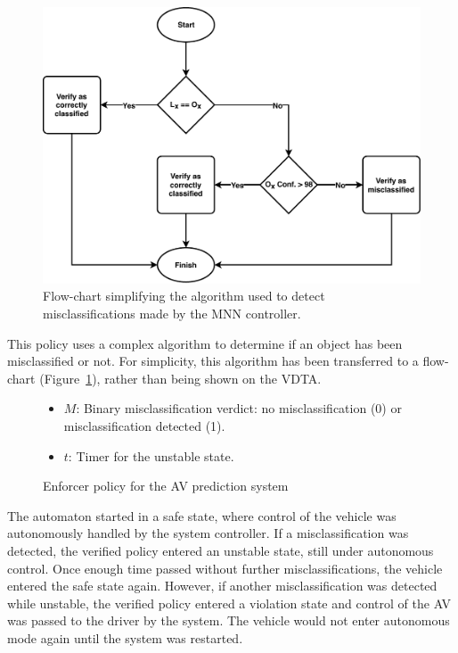 \begin{figure}[h]
	\centering
	\includegraphics[width=\textwidth]{Content/fig/flow-misclassify.pdf}
	\caption{Flow-chart simplifying the algorithm used to detect misclassifications made by the \ac{MNN} controller.} \label{fig:flow}
\end{figure}

This policy uses a complex algorithm to determine if an object has been misclassified or not.
For simplicity, this algorithm has been transferred to a flow-chart (Figure~\ref{fig:flow}), rather than being shown on the \ac{VDTA}.

\begin{figure}[h]
	\centering
	\scalebox{1}{}
	\begin{itemize}
		\item $M$: Binary misclassification verdict: no misclassification (0) or misclassification detected (1).
		\item $t$: Timer for the unstable state.
	\end{itemize}
	
	\caption{Enforcer policy for the \acf{AV} prediction system}
	\label{fig:signrte}
\end{figure}

The automaton started in a safe state, where control of the vehicle was autonomously handled by the system controller.
If a misclassification was detected, the verified policy entered an unstable state, still under autonomous control. 
Once enough time passed without further misclassifications, the vehicle entered the safe state again.
However, if another misclassification was detected while unstable, the verified policy entered a violation state and control of the \ac{AV} was passed to the driver by the system.
The vehicle would not enter autonomous mode again until the system was restarted.






